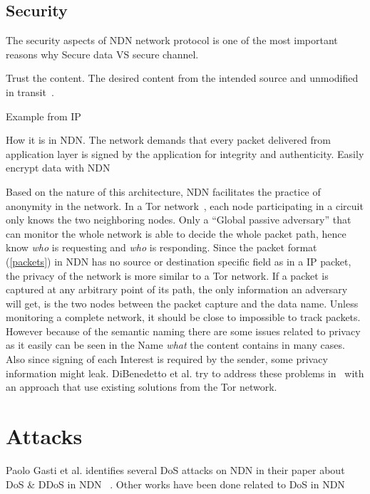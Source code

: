 \subsection{Security}\label{ndn-security}
The security aspects of \gls{NDN} network protocol is one of the most important reasons why 
Secure data VS secure channel.

Trust the content.
The desired content from the intended source and unmodified in transit~\cite{secure-network-content}.

Example from IP

How it is in NDN.
The network demands that every packet delivered from application layer is signed by the application for integrity and authenticity.
Easily encrypt data with \gls{NDN}

Based on the nature of this architecture, \gls{NDN} facilitates the practice of anonymity in the network. 
In a Tor network~\cite{DBLP:conf/uss/DingledineMS04}, each node participating in a circuit only knows the two neighboring nodes.
Only a ``Global passive adversary'' that can monitor the whole network is able to decide the whole packet path, hence know \textit{who} is requesting and \textit{who} is responding.
Since the packet format (\autoref{packets}) in \gls{NDN} has no source or destination specific field as in a \gls{IP} packet, the privacy of the network is more similar to a Tor network.
If a packet is captured at any arbitrary point of its path, the only information an adversary will get, is the two nodes between the packet capture and the data name. 
Unless monitoring a complete network, it should be close to impossible to track packets.  
However because of the semantic naming there are some issues related to privacy as it easily can be seen in the Name \textit{what} the content contains in many cases.
Also since signing of each Interest is required by the sender, some privacy information might leak.
DiBenedetto et al. try to address these problems in~\cite{DBLP:conf/ndss/DiBenedettoGTU12} with an approach that use existing solutions from the Tor network.



\section{Attacks}

Paolo Gasti et al. identifies several \gls{DoS} attacks on \gls{NDN} in their paper about \gls{DoS} \& \gls{DDoS} in \gls{NDN} ~\cite{DBLP:conf/icccn/GastiTU013}. Other works have been done related to \gls{DoS} in \gls{NDN}~\cite{DBLP:journals/ijcomsys/WangCZQZ14, DBLP:conf/ancs/SoNO13, DBLP:journals/corr/abs-1303-4823}


